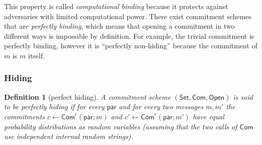 \documentclass{article}
\newtheorem{definition}{Definition}[section]
\newcommand{\setup}[0]{\mathsf{Set}}
\newcommand{\commit}[0]{\mathsf{Com}}
\newcommand{\open}[0]{\mathsf{Open}}
\newcommand{\commitc}[0]{{\mathsf{Com}^{c}}}
\newcommand{\param}[0]{\mathsf{par}}
\begin{document}
\noindent This property is called \emph{computational binding} because it protects against adversaries with limited computational power. There exist commitment schemes that are \emph{perfectly binding}, which means that opening a commitment in two different ways is impossible by definition. For example, the trivial commitment is perfectly binding, however it is ``perfectly non-hiding'' because the commitment of $m$ is $m$ itself.

\subsubsection{Hiding}

\begin{definition}[perfect hiding]
A commitment scheme $(\setup, \commit, \open)$ is said to be perfectly hiding if for every $\param$ and for every two messages $m,m'$ the commitments $c\gets \commitc(\param; m)$ and $c'\gets \commitc(\param; m')$ have equal probability distributions as random variables (assuming that the two calls of $\commit$ use independent internal random strings).
\end{definition}
\end{document}
